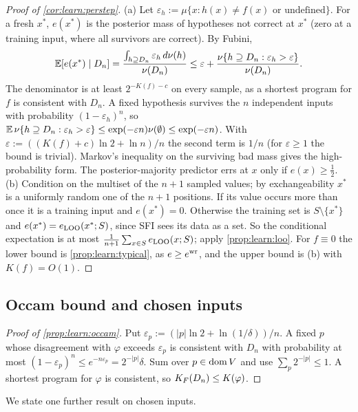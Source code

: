 \begin{proof}[Proof of \cref{cor:learn:perstep}]
(a) Let $\varepsilon_h:=\mu\{x:h(x)\ne f(x)\text{ or undefined}\}$. For a fresh $x^*$, $e(x^*)$ is the posterior mass of hypotheses not correct at $x^*$ (zero at a training input, where all survivors are correct). By Fubini,
\[ \mathbb{E}[e(x^*)\mid D_n]=\frac{\int_{h\supseteq D_n}\varepsilon_h\,d\nu(h)}{\nu(D_n)}\le\varepsilon+\frac{\nu\{h\supseteq D_n:\varepsilon_h>\varepsilon\}}{\nu(D_n)}. \]
The denominator is at least $2^{-K(f)-c}$ on every sample, as a shortest program for $f$ is consistent with $D_n$. A fixed hypothesis survives the $n$ independent inputs with probability $(1-\varepsilon_h)^n$, so $\mathbb{E}\,\nu\{h\supseteq D_n:\varepsilon_h>\varepsilon\}\le\exp(-\varepsilon n)\nu(\emptyset)\le\exp(-\varepsilon n)$. With $\varepsilon:=((K(f)+c)\ln2+\ln n)/n$ the second term is $1/n$ (for $\varepsilon\ge1$ the bound is trivial). Markov's inequality on the surviving bad mass gives the high-probability form. The posterior-majority predictor errs at $x$ only if $e(x)\ge\frac12$.
(b) Condition on the multiset of the $n+1$ sampled values; by exchangeability $x^*$ is a uniformly random one of the $n+1$ positions. If its value occurs more than once it is a training input and $e(x^*)=0$. Otherwise the training set is $S\setminus\{x^*\}$ and $e(x^*)=e_{\rm LOO}(x^*;S)$, since SFI sees its data as a set. So the conditional expectation is at most $\frac1{n+1}\sum_{x\in S}e_{\rm LOO}(x;S)$; apply \cref{prop:learn:loo}.
For $f\equiv0$ the lower bound is \cref{prop:learn:typical}, as $e\ge e^{\rm wr}$, and the upper bound is (b) with $K(f)=O(1)$.
\end{proof}

\subsection{Occam bound and chosen inputs}\label{app:learn:active}

\begin{proof}[Proof of \cref{prop:learn:occam}]
Put $\varepsilon_p:=(|p|\ln2+\ln(1/\delta))/n$. A fixed $p$ whose disagreement with $\varphi$ exceeds $\varepsilon_p$ is consistent with $D_n$ with probability at most $(1-\varepsilon_p)^n\le e^{-n\varepsilon_p}=2^{-|p|}\delta$. Sum over $p\in\operatorname{dom} V$ and use $\sum_p2^{-|p|}\le1$. A shortest program for $\varphi$ is consistent, so $K_{F}(D_n)\le K(\varphi)$.
\end{proof}

We state one further result on chosen inputs.

